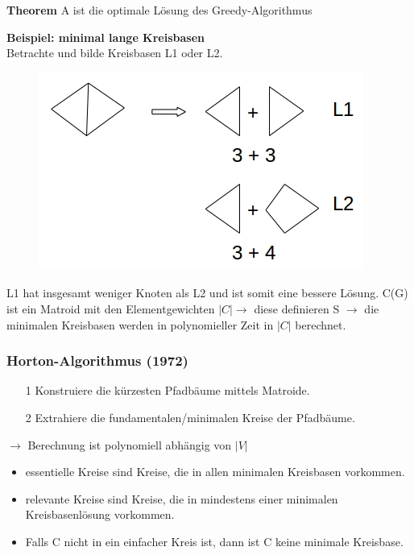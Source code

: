 \textbf{Theorem} \newline A ist die optimale Lösung des Greedy-Algorithmus \newline

\textbf{Beispiel: minimal lange Kreisbasen}\\
Betrachte und bilde Kreisbasen L1 oder L2.\\
\begin{figure}[htp]
\centering
\includegraphics[scale=1.00]{lectures/161111/pix/pic3.jpg}
\end{figure}
L1 hat insgesamt weniger Knoten als L2 und ist somit eine bessere Lösung. C(G) ist ein Matroid mit den Elementgewichten $|C| \rightarrow$ diese definieren S $\rightarrow$ die minimalen Kreisbasen werden in polynomieller Zeit in $|C|$ berechnet.
\subsubsection{Horton-Algorithmus (1972)}
\begin{itemize}
	\item[1]Konstruiere die kürzesten Pfadbäume mittels Matroide. 
	\item[2]Extrahiere die fundamentalen/minimalen Kreise der Pfadbäume.
\end{itemize}
$\rightarrow$ Berechnung ist polynomiell abhängig von $|V|$
\begin{itemize}
	\item essentielle Kreise sind Kreise, die in allen minimalen Kreisbasen vorkommen. 
	\item relevante Kreise sind Kreise, die in mindestens einer minimalen Kreisbasenlösung vorkommen.
	\item Falls C nicht in ein einfacher Kreis ist, dann ist C keine minimale Kreisbase.
\end{itemize}